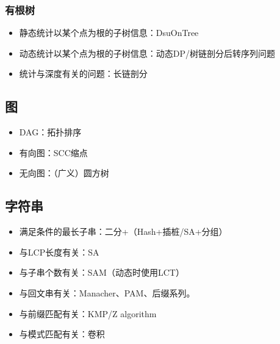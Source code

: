 \subsubsection{有根树}
\begin{itemize}
    \item 静态统计以某个点为根的子树信息：DsuOnTree
    \item 动态统计以某个点为根的子树信息：动态DP/树链剖分后转序列问题
    \item 统计与深度有关的问题：长链剖分
\end{itemize}
\subsection{图}
\begin{itemize}
    \item DAG：拓扑排序
    \item 有向图：SCC缩点
    \item 无向图：（广义）圆方树
\end{itemize}
\subsection{字符串}
\begin{itemize}
    \item 满足条件的最长子串：二分+（Hash+插桩/SA+分组）
    \item 与LCP长度有关：SA
    \item 与子串个数有关：SAM（动态时使用LCT）
    \item 与回文串有关：Manacher、PAM、后缀系列。
    \item 与前缀匹配有关：KMP/Z algorithm
    \item 与模式匹配有关：卷积
\end{itemize}
